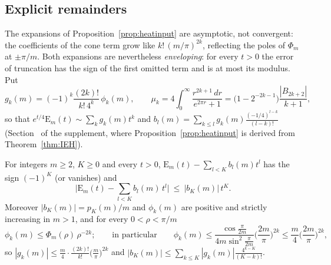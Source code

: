 
\subsection{Explicit remainders}\label{sec:eig-rem}

The expansions of Proposition~\ref{prop:heatinput} are asymptotic, not convergent: the coefficients of the cone term grow like $k!\,(m/\pi)^{2k}$, reflecting the poles of $\Phi_m$ at $\pm\pi/m$. Both expansions are nevertheless \emph{enveloping}: for every $t>0$ the error of truncation has the sign of the first omitted term and is at most its modulus. Put
\[
  g_k(m)=(-1)^k\frac{(2k)!}{k!\,4^k}\,\phi_k(m),\qquad
  \mu_k=4\int_0^\infty\frac{r^{2k+1}\,dr}{e^{2\pi r}+1}=\big(1-2^{-2k-1}\big)\frac{|B_{2k+2}|}{k+1},
\]
so that $e^{t/4}\mathrm E_m(t)\sim\sum_kg_k(m)t^k$ and $b_l(m)=\sum_{k\le l}g_k(m)\frac{(-1/4)^{l-k}}{(l-k)!}$ (Section~ of the supplement, where Proposition~\ref{prop:heatinput} is derived from Theorem~\ref{thm:IEH}).

\begin{proposition}\label{eig:remcone}
For integers $m\ge2$, $K\ge0$ and every $t>0$, $\mathrm E_m(t)-\sum_{l<K}b_l(m)t^l$ has the sign $(-1)^K$ (or vanishes) and
\[
  \Big|\mathrm E_m(t)-\sum_{l<K}b_l(m)\,t^l\Big|\ \le\ |b_K(m)|\,t^K .
\]
Moreover $|b_K(m)|=p_K(m)/m$ and $\phi_k(m)$ are positive and strictly increasing in $m>1$, and for every $0<\rho<\pi/m$
\[
  \phi_k(m)\le\Phi_m(\rho)\,\rho^{-2k};\qquad\text{in particular}\qquad
  \phi_k(m)\le\frac{\cos\frac\pi{2m}}{4m\sin^2\frac\pi{2m}}\Big(\frac{2m}\pi\Big)^{2k}\le\frac m4\Big(\frac{2m}\pi\Big)^{2k},
\]
so $|g_k(m)|\le\frac m4\cdot\frac{(2k)!}{k!}\big(\frac m\pi\big)^{2k}$ and $|b_K(m)|\le\sum_{k\le K}|g_k(m)|\frac{4^{k-K}}{(K-k)!}$.
\end{proposition}

